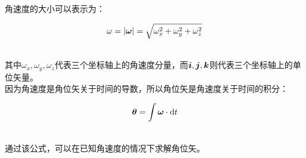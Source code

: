 \documentclass[UTF8]{ctexart}
\newcommand*{\veb}[1]{\vb*{#1}}
\newcommand*{\dif}{\mathop{}\!\mathrm{d}}
\begin{document}
    角速度的大小可以表示为：
    \begin{large}
        \begin{equation*}
            \omega=|\veb{\omega}|=\sqrt{\omega_x^2+\omega_y^2+\omega_z^2}
        \end{equation*}
    \end{large}\\
    其中$\omega_x,\omega_y,\omega_z$代表三个坐标轴上的角速度分量，而$\veb{i},\veb{j},\veb{k}$则代表三个坐标轴上的单位矢量。\\[4mm]
    因为角速度是角位矢关于时间的导数，所以角位矢是角速度关于时间的积分：\vspace{5pt}
    \begin{large}
        \begin{equation*}
            \veb{\theta}=\int \veb{\omega}\cdot\dif t
        \end{equation*}
    \end{large}\\
    通过该公式，可以在已知角速度的情况下求解角位矢。

\newpage
\end{document}
